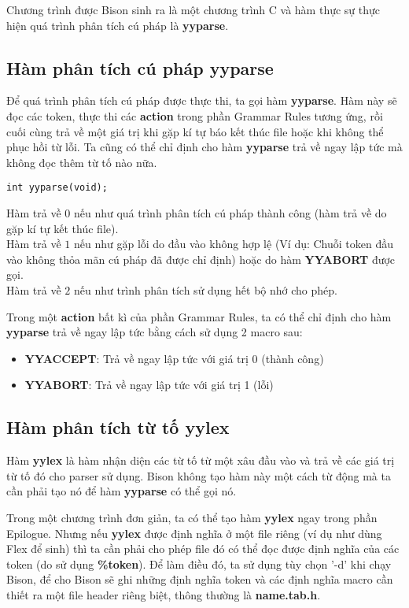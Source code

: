 \documentclass[../report.tex]{subfiles}
\begin{document}
\cite{c-interface} Chương trình được Bison sinh ra là một chương 
trình C và hàm thực sự thực hiện quá trình phân tích cú 
pháp là \textbf{yyparse}.
\subsection{Hàm phân tích cú pháp yyparse} 
Để quá trình phân tích cú pháp được thực thi, ta gọi 
hàm \textbf{yyparse}. Hàm này sẽ đọc các token, 
thực thi các \textbf{action} trong phần 
Grammar Rules tương ứng, rồi cuối cùng trả về một giá trị 
khi gặp kí tự báo kết thúc file hoặc khi không thể phục hồi 
từ lỗi. Ta cũng có thể chỉ định cho hàm \textbf{yyparse}
trả về ngay lập tức mà không đọc thêm từ tố nào nữa. 

\begin{lstlisting}
int yyparse(void);
\end{lstlisting}
Hàm trả về $0$ nếu như quá trình phân tích cú pháp thành công (hàm 
trả về do gặp kí tự kết thúc file). \\
Hàm trả về $1$ nếu như gặp lỗi do đầu vào không hợp lệ (Ví dụ: Chuỗi
token đầu vào không thỏa mãn cú pháp đã được chỉ định) hoặc do 
hàm \textbf{YYABORT} được gọi.  \\
Hàm trả về $2$ nếu như trình phân tích sử dụng hết bộ nhớ cho phép. 

Trong một \textbf{action} bất kì của phần Grammar Rules, ta có 
thể chỉ định cho hàm \textbf{yyparse} trả về ngay lập tức bằng 
cách sử dụng 2 macro sau: 
\begin{itemize}
\item \textbf{YYACCEPT}: Trả về ngay lập tức với giá trị 0 
(thành công)
\item \textbf{YYABORT}: Trả về ngay lập tức với giá trị 1 
(lỗi)
\end{itemize}

\subsection{Hàm phân tích từ tố yylex}
Hàm \textbf{yylex} là hàm nhận diện các từ tố từ một xâu đầu vào 
và trả về các giá trị từ tố đó cho parser sử dụng. 
Bison không tạo hàm này một cách từ động mà ta cần phải tạo nó 
để hàm \textbf{yyparse} có thể gọi nó. 

Trong một chương trình đơn giản, ta có thể tạo hàm \textbf{yylex}
ngay trong phần Epilogue. Nhưng nếu \textbf{yylex} được 
định nghĩa ở một file riêng (ví dụ như dùng Flex để sinh) 
thì ta cần phải cho phép file đó có thể đọc được định nghĩa 
của các token (do sử dụng \textbf{\%token}). 
Để làm điều đó, ta sử dụng tùy chọn '-d' khi chạy Bison, để cho 
Bison sẽ ghi những định nghĩa token và các định nghĩa macro cần 
thiết ra một file header riêng biệt, thông thường là 
\textbf{name.tab.h}.
\end{document}
